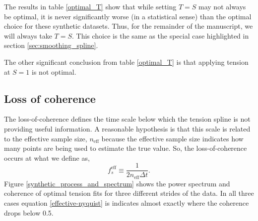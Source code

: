 \documentclass[10pt,journal]{IEEEtran}
\begin{document}
The results in table \ref{optimal_T} show that while setting $T=S$ may not always be optimal, it is never significantly worse (in a statistical sense) than the optimal choice for these synthetic datasets. Thus, for the remainder of the manuscript, we will always take $T=S$. This choice is the same as the special case highlighted in section \ref{sec:smoothing_spline}.

The other significant conclusion from table \ref{optimal_T} is that applying tension at $S=1$ is not optimal.



\subsection{Loss of coherence} \label{loss_of_coherence}

The loss-of-coherence defines the time scale below which the tension spline is not providing useful information. A reasonable hypothesis is that this scale is related to the effective sample size, $n_{\textrm{eff}}$ because the effective sample size indicates how many points are being used to estimate the true value. So, the loss-of-coherence occurs at what we define as,
\begin{equation}
\label{effective-nyquist}
    f_s^{\textrm{eff}} \equiv \frac{1}{2 n_{\textrm{eff}} \Delta t}.
\end{equation}
Figure \ref{synthetic_process_and_spectrum} shows the power spectrum and coherence of optimal tension fits for three different strides of the data. In all three cases equation \ref{effective-nyquist} is indicates almost exactly where the coherence drops below 0.5.
\end{document}

